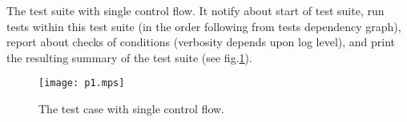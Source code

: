 \documentclass[a4paper,twoside]{article}
\begin{document}
%
%
%

The test suite with single control flow. It notify about start of test suite,
run tests within this test suite (in the order following from tests dependency
graph), report about checks of conditions (verbosity depends upon log level), and print the resulting summary of the test suite (see fig.\ref{SingleFlow}).

\begin{figure}
  \begin{center}
%  
%   
  \texttt{[image: p1.mps]}
  \end{center}
  \caption{The test case with single control flow.\label{SingleFlow}}
\end{figure}
\end{document}
